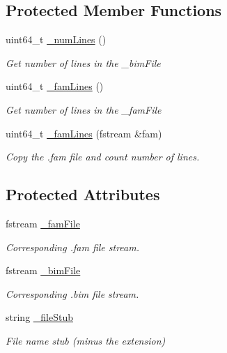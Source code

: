 \subsection*{Protected Member Functions}
\begin{DoxyCompactItemize}
\item 
uint64\+\_\+t \hyperlink{classvarfiles_1_1_bed_file_a927cd985ae4d5897a052c2219391eae3}{\+\_\+num\+Lines} ()
\begin{DoxyCompactList}\small\item\em Get number of lines in the {\ttfamily \+\_\+bim\+File} \end{DoxyCompactList}\item 
uint64\+\_\+t \hyperlink{classvarfiles_1_1_bed_file_a0e1a2245d0ed290c6d333272868d8a74}{\+\_\+fam\+Lines} ()
\begin{DoxyCompactList}\small\item\em Get number of lines in the {\ttfamily \+\_\+fam\+File} \end{DoxyCompactList}\item 
uint64\+\_\+t \hyperlink{classvarfiles_1_1_bed_file_a646e0a39517924cfd4f8f6ea394dd940}{\+\_\+fam\+Lines} (fstream \&fam)
\begin{DoxyCompactList}\small\item\em Copy the .fam file and count number of lines. \end{DoxyCompactList}\end{DoxyCompactItemize}
\subsection*{Protected Attributes}
\begin{DoxyCompactItemize}
\item 
\mbox{\label{classvarfiles_1_1_bed_file_ae8abd6f900b719b8b5a5e9b283098a37}} 
fstream \hyperlink{classvarfiles_1_1_bed_file_ae8abd6f900b719b8b5a5e9b283098a37}{\+\_\+fam\+File}
\begin{DoxyCompactList}\small\item\em Corresponding .fam file stream. \end{DoxyCompactList}\item 
\mbox{\label{classvarfiles_1_1_bed_file_a183816d8a43637896a434db71238470b}} 
fstream \hyperlink{classvarfiles_1_1_bed_file_a183816d8a43637896a434db71238470b}{\+\_\+bim\+File}
\begin{DoxyCompactList}\small\item\em Corresponding .bim file stream. \end{DoxyCompactList}\item 
\mbox{\label{classvarfiles_1_1_bed_file_abb8aa2e09e51ad278cf7b9e7951530bd}} 
string \hyperlink{classvarfiles_1_1_bed_file_abb8aa2e09e51ad278cf7b9e7951530bd}{\+\_\+file\+Stub}
\begin{DoxyCompactList}\small\item\em File name stub (minus the extension) \end{DoxyCompactList}\end{DoxyCompactItemize}


